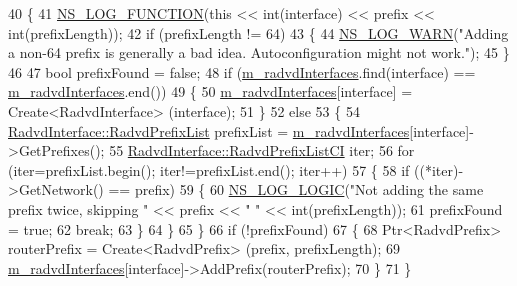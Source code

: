 \begin{DoxyCode}
40 \{
41   \hyperlink{log-macros-disabled_8h_a90b90d5bad1f39cb1b64923ea94c0761}{NS\_LOG\_FUNCTION}(\textcolor{keyword}{this} << \textcolor{keywordtype}{int}(interface) << prefix << \textcolor{keywordtype}{int}(prefixLength));
42   \textcolor{keywordflow}{if} (prefixLength != 64)
43     \{
44       \hyperlink{group__logging_gade7208b4009cdf0e25783cd26766f559}{NS\_LOG\_WARN}(\textcolor{stringliteral}{"Adding a non-64 prefix is generally a bad idea. Autoconfiguration might not
       work."});
45     \}
46 
47   \textcolor{keywordtype}{bool} prefixFound = \textcolor{keyword}{false};
48   \textcolor{keywordflow}{if} (\hyperlink{classns3_1_1RadvdHelper_a90792a45cd3b20d6eb1f4bc0b4dd20ba}{m\_radvdInterfaces}.find(interface) == \hyperlink{classns3_1_1RadvdHelper_a90792a45cd3b20d6eb1f4bc0b4dd20ba}{m\_radvdInterfaces}.end())
49     \{
50       \hyperlink{classns3_1_1RadvdHelper_a90792a45cd3b20d6eb1f4bc0b4dd20ba}{m\_radvdInterfaces}[interface] = Create<RadvdInterface> (interface);
51     \}
52   \textcolor{keywordflow}{else}
53     \{
54       \hyperlink{classns3_1_1RadvdInterface_a25f72232730563f395b822cf912e9f5e}{RadvdInterface::RadvdPrefixList} prefixList = 
      \hyperlink{classns3_1_1RadvdHelper_a90792a45cd3b20d6eb1f4bc0b4dd20ba}{m\_radvdInterfaces}[interface]->GetPrefixes();
55       \hyperlink{classns3_1_1RadvdInterface_a909765e6a9cf829194d2db99c2fb041d}{RadvdInterface::RadvdPrefixListCI} iter;
56       \textcolor{keywordflow}{for} (iter=prefixList.begin(); iter!=prefixList.end(); iter++)
57         \{
58           \textcolor{keywordflow}{if} ((*iter)->GetNetwork() == prefix)
59             \{
60               \hyperlink{group__logging_ga88acd260151caf2db9c0fc84997f45ce}{NS\_LOG\_LOGIC}(\textcolor{stringliteral}{"Not adding the same prefix twice, skipping "} << prefix << \textcolor{stringliteral}{" "} << \textcolor{keywordtype}{
      int}(prefixLength));
61               prefixFound = \textcolor{keyword}{true};
62               \textcolor{keywordflow}{break};
63             \}
64         \}
65     \}
66   \textcolor{keywordflow}{if} (!prefixFound)
67     \{
68       Ptr<RadvdPrefix> routerPrefix = Create<RadvdPrefix> (prefix, prefixLength);
69       \hyperlink{classns3_1_1RadvdHelper_a90792a45cd3b20d6eb1f4bc0b4dd20ba}{m\_radvdInterfaces}[interface]->AddPrefix(routerPrefix);
70     \}
71 \}
\end{DoxyCode}
